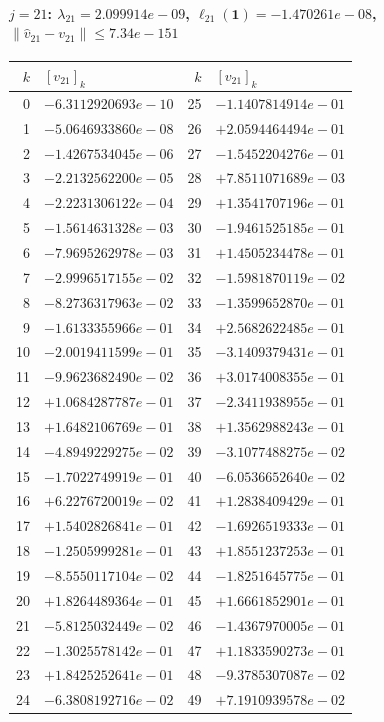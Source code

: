 \documentclass[11pt]{article}
\begin{document}
\paragraph{$j = 21$: $\lambda_{21} = 2.099914e-09$, \quad $\ell_{21}(\mathbf{1}) = -1.470261e-08$, \quad $\|\hat v_{21} - v_{21}\| \leq 7.34e-151$}
\begin{center}
{\footnotesize
\begin{tabular}{r@{\;\;}l@{\quad}r@{\;\;}l}
\toprule
$k$ & $[v_{21}]_k$ & $k$ & $[v_{21}]_k$ \\
\midrule
0 & $-6.3112920693e-10$ & 25 & $-1.1407814914e-01$ \\
1 & $-5.0646933860e-08$ & 26 & $+2.0594464494e-01$ \\
2 & $-1.4267534045e-06$ & 27 & $-1.5452204276e-01$ \\
3 & $-2.2132562200e-05$ & 28 & $+7.8511071689e-03$ \\
4 & $-2.2231306122e-04$ & 29 & $+1.3541707196e-01$ \\
5 & $-1.5614631328e-03$ & 30 & $-1.9461525185e-01$ \\
6 & $-7.9695262978e-03$ & 31 & $+1.4505234478e-01$ \\
7 & $-2.9996517155e-02$ & 32 & $-1.5981870119e-02$ \\
8 & $-8.2736317963e-02$ & 33 & $-1.3599652870e-01$ \\
9 & $-1.6133355966e-01$ & 34 & $+2.5682622485e-01$ \\
10 & $-2.0019411599e-01$ & 35 & $-3.1409379431e-01$ \\
11 & $-9.9623682490e-02$ & 36 & $+3.0174008355e-01$ \\
12 & $+1.0684287787e-01$ & 37 & $-2.3411938955e-01$ \\
13 & $+1.6482106769e-01$ & 38 & $+1.3562988243e-01$ \\
14 & $-4.8949229275e-02$ & 39 & $-3.1077488275e-02$ \\
15 & $-1.7022749919e-01$ & 40 & $-6.0536652640e-02$ \\
16 & $+6.2276720019e-02$ & 41 & $+1.2838409429e-01$ \\
17 & $+1.5402826841e-01$ & 42 & $-1.6926519333e-01$ \\
18 & $-1.2505999281e-01$ & 43 & $+1.8551237253e-01$ \\
19 & $-8.5550117104e-02$ & 44 & $-1.8251645775e-01$ \\
20 & $+1.8264489364e-01$ & 45 & $+1.6661852901e-01$ \\
21 & $-5.8125032449e-02$ & 46 & $-1.4367970005e-01$ \\
22 & $-1.3025578142e-01$ & 47 & $+1.1833590273e-01$ \\
23 & $+1.8425252641e-01$ & 48 & $-9.3785307087e-02$ \\
24 & $-6.3808192716e-02$ & 49 & $+7.1910939578e-02$ \\
\bottomrule
\end{tabular}
}
\end{center}
\end{document}

